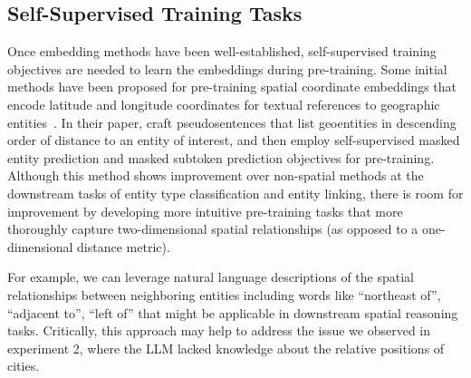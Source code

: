 




\subsection{Self-Supervised Training Tasks}
Once embedding methods have been well-established, self-supervised training objectives are needed to learn the embeddings during pre-training.
%
Some initial methods have been proposed for pre-training spatial coordinate embeddings that encode latitude and longitude coordinates for textual references to geographic entities~\cite{Li2021}.
In their paper, \citeauthor{Li2021} craft pseudosentences that list geoentities in descending order of distance to an entity of interest, and then employ self-supervised masked entity prediction and masked subtoken prediction objectives for pre-training.
Although this method shows improvement over non-spatial methods at the downstream tasks of entity type classification and entity linking, there is room for improvement by developing more intuitive pre-training tasks that more thoroughly capture two-dimensional spatial relationships (as opposed to a one-dimensional distance metric).

For example, we can leverage natural language descriptions of the spatial relationships between neighboring entities including words like ``northeast of'', ``adjacent to'', ``left of'' that might be applicable in downstream spatial reasoning tasks.
Critically, this approach may help to address the issue we observed in experiment 2, where the LLM lacked knowledge about the relative positions of cities.

